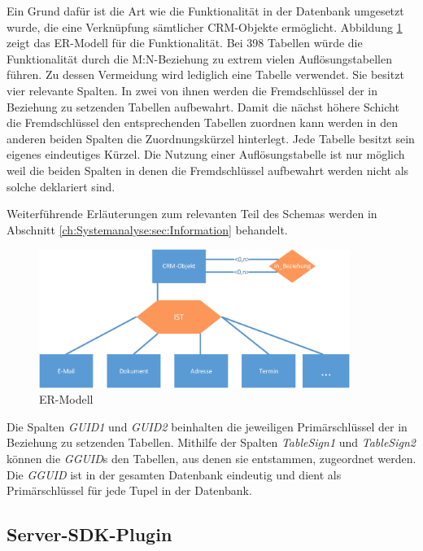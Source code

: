 Ein Grund dafür ist die Art wie die Funktionalität in der Datenbank umgesetzt wurde, die eine Verknüpfung sämtlicher CRM-Objekte ermöglicht. Abbildung \ref{gw_2} zeigt das ER-Modell für die Funktionalität. Bei 398 Tabellen würde die Funktionalität durch die M:N-Beziehung zu extrem vielen Auflösungstabellen führen. Zu dessen Vermeidung wird lediglich eine Tabelle verwendet. Sie besitzt vier relevante Spalten. In zwei von ihnen werden die Fremdschlüssel der in Beziehung zu setzenden Tabellen aufbewahrt. Damit die nächst höhere Schicht die Fremdschlüssel den entsprechenden Tabellen zuordnen kann werden in den anderen beiden Spalten die Zuordnungskürzel hinterlegt. Jede Tabelle besitzt sein eigenes eindeutiges Kürzel. Die Nutzung einer Auflösungstabelle ist nur möglich weil die beiden Spalten in denen die Fremdschlüssel aufbewahrt werden nicht als solche deklariert sind.

Weiterführende Erläuterungen zum relevanten Teil des Schemas werden in Abschnitt \ref{ch:Systemanalyse:sec:Information} behandelt.

\begin{figure}[ht]
	\centering
  \includegraphics[width=0.9\textwidth, width=0.9\textwidth]{pics/erm.pdf}
	\caption{ER-Modell}
	\label{gw_2}
\end{figure}

Die Spalten \textit{GUID1} und \textit{GUID2} beinhalten die jeweiligen Primärschlüssel der in Beziehung zu setzenden Tabellen. Mithilfe der Spalten \textit{TableSign1} und \textit{TableSign2} können die \textit{GGUID}s den Tabellen, aus denen sie entstammen, zugeordnet werden. Die \textit{GGUID} ist in der gesamten Datenbank eindeutig und dient als Primärschlüssel für jede Tupel in der Datenbank.

\subsection{Server-SDK-Plugin}
\label{ch:Systemanalyse:sec:genesisWorld:subsec:plugin}

